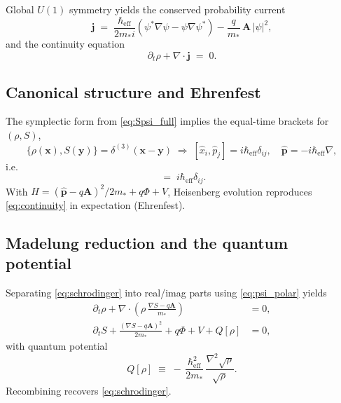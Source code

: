 Global \(U(1)\) symmetry yields the conserved probability current
\begin{equation}
\mathbf j \;=\; \frac{\hbar_{\mathrm{eff}}}{2m_* i}\left(\psi^* \nabla \psi - \psi \nabla \psi^* \right) - \frac{q}{m_*}\,\mathbf A\,|\psi|^2,
\label{eq:current}
\end{equation}
and the continuity equation
\begin{equation}
\partial_t \rho + \nabla\!\cdot\!\mathbf j \;=\; 0.
\label{eq:continuity}
\end{equation}

\subsection{Canonical structure and Ehrenfest}
\label{sec:QM_ops}

The symplectic form from \eqref{eq:Spsi_full} implies the equal-time brackets for \((\rho,S)\),
\[
\{\rho(\mathbf{x}),S(\mathbf{y})\}=\delta^{(3)}(\mathbf{x}-\mathbf{y}) \;\Rightarrow\; [\hat{x}_i,\hat{p}_j]= i\hbar_{\mathrm{eff}}\delta_{ij},\quad \hat{\mathbf p}=-i\hbar_{\mathrm{eff}}\nabla ,
\]
i.e.
\begin{equation}
[\hat{x}_i,\hat{p}_j] \;=\; i\hbar_{\mathrm{eff}}\delta_{ij}.
\label{eq:commutator}
\end{equation}
With \(\hat H = (\hat{\mathbf p}-q\mathbf A)^2/2m_* + q\Phi + V\), Heisenberg evolution reproduces \eqref{eq:continuity} in expectation (Ehrenfest).

\subsection{Madelung reduction and the quantum potential}
\label{sec:QM_madelung_detail}

Separating \eqref{eq:schrodinger} into real/imag parts using \eqref{eq:psi_polar} yields
\begin{align}
\partial_t \rho + \nabla\!\cdot\!\left(\rho\,\frac{\nabla S - q\mathbf A}{m_*}\right) &= 0, 
\label{eq:HJ_cont_redux}\\
\partial_t S + \frac{(\nabla S - q\mathbf A)^2}{2m_*} + q\Phi + V + Q[\rho] &= 0,
\label{eq:HJ_quantum}
\end{align}
with quantum potential
\begin{equation}
Q[\rho] \;\equiv\; -\,\frac{\hbar_{\mathrm{eff}}^{2}}{2m_*}\,\frac{\nabla^2\sqrt{\rho}}{\sqrt{\rho}} .
\label{eq:Q_potential}
\end{equation}
Recombining recovers \eqref{eq:schrodinger}.

